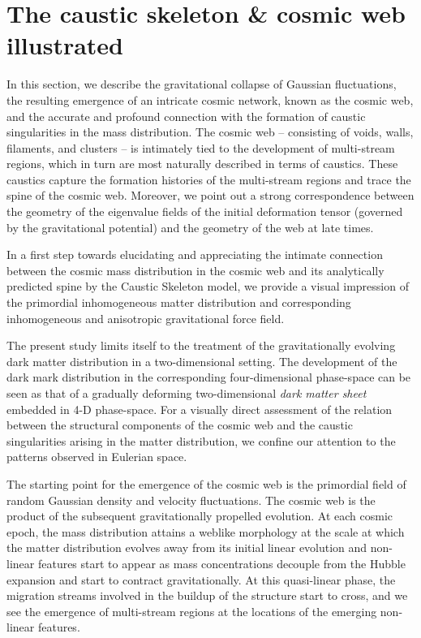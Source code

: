 \documentclass[a4paper, 11pt]{article}
\begin{document}
\section{The caustic skeleton \& cosmic web illustrated}
\label{sec:Eulerian_space}
In this section, we describe the gravitational collapse of Gaussian fluctuations, the resulting emergence of an intricate cosmic network, known as the cosmic web, and the accurate and profound connection with the formation of caustic singularities in the mass distribution. The cosmic web -- consisting of voids, walls, filaments, and clusters -- is intimately tied to the development of multi-stream regions, which in turn are most naturally described in terms of caustics. These caustics capture the formation histories of the multi-stream regions and trace the spine of the cosmic web. Moreover, we point out a strong correspondence between the geometry of the eigenvalue fields of the initial deformation tensor (governed by the gravitational potential) and the geometry of the web at late times. 

In a first step towards elucidating and appreciating the intimate connection between the cosmic mass distribution in the cosmic web and its analytically predicted spine by the Caustic Skeleton model, we provide a visual impression of the primordial inhomogeneous matter distribution and corresponding inhomogeneous and anisotropic gravitational force field.

The present study limits itself to the treatment of the gravitationally evolving dark matter distribution in a two-dimensional setting. The development of the dark mark distribution in the corresponding four-dimensional phase-space can be seen as that of a gradually deforming two-dimensional {\it dark matter sheet} embedded in 4-D phase-space. For a visually direct assessment of the relation between the structural components of the cosmic web and the caustic singularities arising in the matter distribution, we confine our attention to the patterns observed in Eulerian space. 

The starting point for the emergence of the cosmic web is the primordial field of random Gaussian density and velocity fluctuations. The cosmic web is the product of the subsequent gravitationally propelled evolution. At each cosmic epoch, the mass distribution attains a weblike morphology at the scale at which the matter distribution evolves away from its initial linear evolution and non-linear features start to appear as mass concentrations decouple from the Hubble expansion and start to contract gravitationally. At this quasi-linear phase, the migration streams involved in the buildup of the structure start to cross, and we see the emergence of multi-stream regions at the locations of the emerging non-linear features. 
\end{document}
